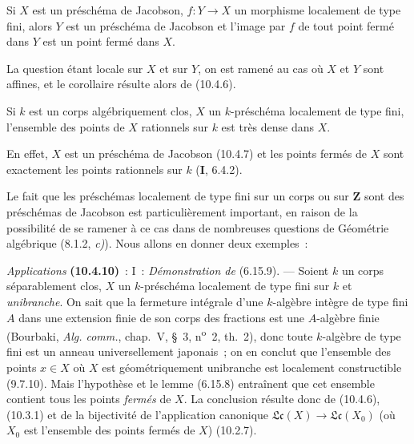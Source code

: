 \begin{corollary}[10.4.7]
\label{IV.10.4.7-fr}
Si $X$ est un préschéma de Jacobson, $f:Y\to X$ un morphisme localement de type
fini, alors $Y$ est un préschéma de Jacobson et l'image par $f$ de tout point
fermé dans $Y$ est un point fermé dans $X$.
\end{corollary}

La question étant locale sur $X$ et sur $Y$, on est ramené au cas où $X$ et
$Y$ sont affines, et le corollaire résulte alors de (10.4.6).

\begin{corollary}[10.4.8]
\label{IV.10.4.8-fr}
Si $k$ est un corps algébriquement clos, $X$ un $k$-préschéma localement de
type fini, l'ensemble des points de $X$ rationnels sur $k$ est très dense dans
$X$.
\end{corollary}

En effet, $X$ est un préschéma de Jacobson (10.4.7) et les points fermés de
$X$ sont exactement les points rationnels sur $k$ (\textbf{I}, 6.4.2).

\begin{env}[10.4.9]
\label{IV.10.4.9-fr}
Le fait que les préschémas localement de type fini sur un corps ou sur
$\mathbf Z$ sont des préschémas de Jacobson est particulièrement important,
en raison de la possibilité de se ramener à ce cas dans de nombreuses
questions de Géométrie algébrique (8.1.2, \emph{c)}). Nous allons en donner
deux exemples~:
\end{env}

\par\medskip\noindent\label{IV.10.4.10-fr}%
\emph{Applications} \textbf{(10.4.10)}~: I~: \emph{Démonstration de} (6.15.9). --- Soient
$k$ un corps séparablement clos, $X$ un $k$-préschéma localement de type fini
sur $k$ et \emph{unibranche}. On sait que la fermeture intégrale d'une
$k$-algèbre intègre de type fini $A$ dans une extension finie de son corps des
fractions est une $A$-algèbre finie (Bourbaki, \emph{Alg. comm.}, chap.~V,
\S~3, n\textsuperscript{o}~2, th.~2), donc toute $k$-algèbre de type fini est
un anneau universellement japonais~; on en conclut que l'ensemble des points
$x\in X$ où $X$ est géométriquement unibranche est localement constructible
(9.7.10). Mais l'hypothèse et le lemme (6.15.8) entraînent que cet ensemble
contient tous les points \emph{fermés} de $X$. La conclusion résulte donc de
(10.4.6), (10.3.1) et de la bijectivité de l'application canonique
$\mathfrak{Lc}(X)\to\mathfrak{Lc}(X_0)$ (où $X_0$ est l'ensemble des points
fermés de $X$) (10.2.7).
\par

